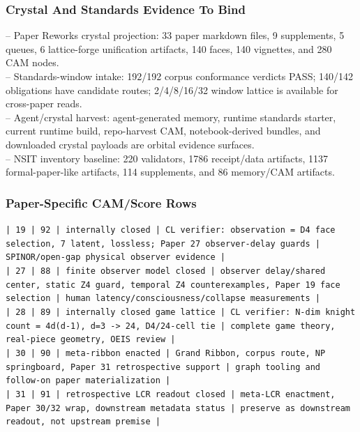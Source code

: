 \documentclass[11pt]{article}
\begin{document}
\subsubsection*{Crystal And Standards Evidence To Bind}

\noindent{}-- Paper Reworks crystal projection: 33 paper markdown files, 9 supplements, 5 queues, 6 lattice-forge unification artifacts, 140 faces, 140 vignettes, and 280 CAM nodes.\\
\noindent{}-- Standards-window intake: 192/192 corpus conformance verdicts PASS; 140/142 obligations have candidate routes; 2/4/8/16/32 window lattice is available for cross-paper reads.\\
\noindent{}-- Agent/crystal harvest: agent-generated memory, runtime standards starter, current runtime build, repo-harvest CAM, notebook-derived bundles, and downloaded crystal payloads are orbital evidence surfaces.\\
\noindent{}-- NSIT inventory baseline: 220 validators, 1786 receipt/data artifacts, 1137 formal-paper-like artifacts, 114 supplements, and 86 memory/CAM artifacts.\\

\subsubsection*{Paper-Specific CAM/Score Rows}

\noindent\texttt{| 19 | 92 | internally closed | CL verifier: observation = D4 face selection, 7 latent, lossless; Paper 27 observer-delay guards | SPINOR/open-gap physical observer evidence |}\\
\noindent\texttt{| 27 | 88 | finite observer model closed | observer delay/shared center, static Z4 guard, temporal Z4 counterexamples, Paper 19 face selection | human latency/consciousness/collapse measurements |}\\
\noindent\texttt{| 28 | 89 | internally closed game lattice | CL verifier: N-dim knight count = 4d(d-1), d=3 -> 24, D4/24-cell tie | complete game theory, real-piece geometry, OEIS review |}\\
\noindent\texttt{| 30 | 90 | meta-ribbon enacted | Grand Ribbon, corpus route, NP springboard, Paper 31 retrospective support | graph tooling and follow-on paper materialization |}\\
\noindent\texttt{| 31 | 91 | retrospective LCR readout closed | meta-LCR enactment, Paper 30/32 wrap, downstream metadata status | preserve as downstream readout, not upstream premise |}\\
\end{document}
